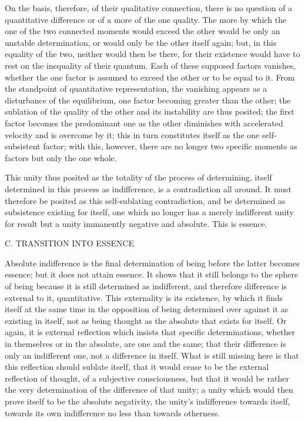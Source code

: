 On the basis, therefore, of their qualitative connection,
there is no question of a quantitative difference
or of a more of the one quality.
The more by which the one of the two connected moments
would exceed the other would be only an unstable determination,
or would only be the other itself again;
but, in this equality of the two, neither would then be there,
for their existence would have to rest on the inequality of their quantum.
Each of these supposed factors vanishes,
whether the one factor is assumed
to exceed the other or to be equal to it.
From the standpoint of quantitative representation,
the vanishing appears as a disturbance of the equilibrium,
one factor becoming greater than the other;
the sublation of the quality of the other
and its instability are thus posited;
the first factor becomes the predominant one
as the other diminishes with accelerated velocity
and is overcome by it;
this in turn constitutes itself as the one self-subsistent factor;
with this, however, there are no longer two specific moments
as factors but only the one whole.

This unity thus posited as the totality
of the process of determining,
itself determined in this process as indifference,
is a contradiction all around.
It must therefore be posited
as this self-sublating contradiction,
and be determined as subsistence existing for itself,
one which no longer has a merely indifferent unity
for result but a unity immanently negative and absolute.
This is essence.

C. TRANSITION INTO ESSENCE

Absolute indifference is the final determination of being
before the latter becomes essence;
but it does not attain essence.
It shows that it still belongs to the sphere of being
because it is still determined as indifferent,
and therefore difference is external to it, quantitative.
This externality is its existence, by which
it finds itself at the same time in the opposition of
being determined over against it as existing in itself,
not as being thought as the absolute that exists for itself.
Or again, it is external reflection
which insists that specific determinations,
whether in themselves or in the absolute,
are one and the same;
that their difference is only an indifferent one,
not a difference in itself.
What is still missing here is that
this reflection should sublate itself,
that it would cease to be the external
reflection of thought, of a subjective consciousness,
but that it would be rather the very determination of
the difference of that unity;
a unity which would then prove itself to be the absolute negativity,
the unity's indifference towards itself,
towards its own indifference no less than towards otherness.

